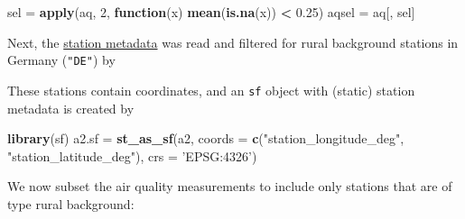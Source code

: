 \documentclass[]{book}
\newenvironment{Shaded}{\begin{snugshade}}{\end{snugshade}}
\newcommand{\CharTok}[1]{\textcolor[rgb]{0.31,0.60,0.02}{#1}}
\newcommand{\ControlFlowTok}[1]{\textcolor[rgb]{0.13,0.29,0.53}{\textbf{#1}}}
\newcommand{\DataTypeTok}[1]{\textcolor[rgb]{0.13,0.29,0.53}{#1}}
\newcommand{\DecValTok}[1]{\textcolor[rgb]{0.00,0.00,0.81}{#1}}
\newcommand{\FloatTok}[1]{\textcolor[rgb]{0.00,0.00,0.81}{#1}}
\newcommand{\KeywordTok}[1]{\textcolor[rgb]{0.13,0.29,0.53}{\textbf{#1}}}
\newcommand{\NormalTok}[1]{#1}
\newcommand{\OperatorTok}[1]{\textcolor[rgb]{0.81,0.36,0.00}{\textbf{#1}}}
\newcommand{\OtherTok}[1]{\textcolor[rgb]{0.56,0.35,0.01}{#1}}
\newcommand{\StringTok}[1]{\textcolor[rgb]{0.31,0.60,0.02}{#1}}
\begin{document}
\begin{Shaded}
\begin{Highlighting}[]
\NormalTok{sel =}\StringTok{ }\KeywordTok{apply}\NormalTok{(aq, }\DecValTok{2}\NormalTok{, }\ControlFlowTok{function}\NormalTok{(x) }\KeywordTok{mean}\NormalTok{(}\KeywordTok{is.na}\NormalTok{(x)) }\OperatorTok{<}\StringTok{ }\FloatTok{0.25}\NormalTok{)}
\NormalTok{aqsel =}\StringTok{ }\NormalTok{aq[, sel]}
\end{Highlighting}
\end{Shaded}

Next, the \href{http://ftp.eea.europa.eu/www/AirBase_v8/AirBase_v8_stations.zip}{station metadata} was read
and filtered for rural background stations in Germany (\texttt{"DE"}) by

\begin{Shaded}
\end{Shaded}

These stations contain coordinates, and an \texttt{sf} object with (static) station metadata is created by

\begin{Shaded}
\begin{Highlighting}[]
\KeywordTok{library}\NormalTok{(sf)}
\NormalTok{a2.sf =}\StringTok{ }\KeywordTok{st_as_sf}\NormalTok{(a2, }\DataTypeTok{coords =} \KeywordTok{c}\NormalTok{(}\StringTok{"station_longitude_deg"}\NormalTok{, }\StringTok{"station_latitude_deg"}\NormalTok{), }\DataTypeTok{crs =} \StringTok{'EPSG:4326'}\NormalTok{)}
\end{Highlighting}
\end{Shaded}

We now subset the air quality measurements to include only stations that are of type rural background:
\end{document}
